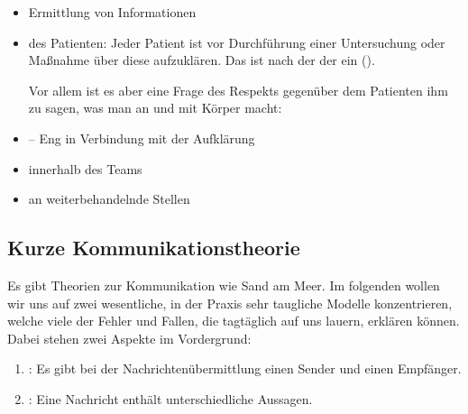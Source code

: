 \documentclass[
ngerman,
paper=a4,
asymmetric,
fontsize=10pt,
draft=false,
numbers=noenddot,
bibtotocnumbered,
footnotes=multiple,
]{scrreprt}
\begin{document}
\begin{itemize}
  \item Ermittlung von Informationen
  \item {} des Patienten: Jeder Patient ist vor
  Durchführung einer Untersuchung oder Maßnahme über
  diese aufzuklären.
  Das  ist nach der
   der  ein 
  ().
  
  Vor allem ist es aber eine Frage des Respekts  gegenüber
  dem Patienten ihm zu sagen, was man an und mit 
  Körper macht:
  \item {} -- Eng in Verbindung mit
  der Aufklärung
  \item {} innerhalb des Teams
  \item {} an weiterbehandelnde
  Stellen
\end{itemize}

\subsection{Kurze Kommunikationstheorie}

Es gibt Theorien zur Kommunikation wie Sand am Meer. Im
folgenden wollen wir uns auf zwei wesentliche, in der Praxis
sehr taugliche Modelle konzentrieren, welche viele der
Fehler und Fallen, die tagtäglich auf uns lauern, erklären
können. Dabei stehen zwei Aspekte im Vordergrund:
\begin{enumerate}
  \item {}: Es gibt bei der
  Nachrichtenübermittlung einen Sender und einen Empfänger.
  \item {}: Eine Nachricht enthält
  unterschiedliche Aussagen.
\end{enumerate}
\end{document}
